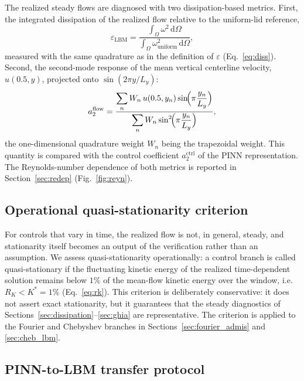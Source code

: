 \documentclass[aip,pof,reprint,superscriptaddress]{revtex4-2}
\begin{document}
The realized steady flows are diagnosed with two dissipation-based metrics. First, the integrated dissipation of the realized flow relative to the uniform-lid reference,
\begin{equation}\label{eq:lbm_diss}
\varepsilon_{\mathrm{LBM}}=\frac{\displaystyle\int_\Omega \omega^2\,\mathrm{d}\Omega}{\displaystyle\int_\Omega \omega_{\mathrm{uniform}}^2\,\mathrm{d}\Omega},
\end{equation}
measured with the same quadrature as in the definition of $\varepsilon$ (Eq.~\eqref{eq:diss}). Second, the second-mode response of the mean vertical centerline velocity,\\
$u(0.5,y)$, projected onto $\sin(2\pi y/L_y)$:
\begin{equation}\label{eq:lbm_phi}
a_2^{\mathrm{flow}}=\frac{\displaystyle\sum_{n}W_n\,u(0.5,y_n)\sin\!\Bigl(\pi\frac{y_n}{L_y}\Bigr)}{\displaystyle\sum_{n}W_n\sin^2\!\Bigl(\pi\frac{y_n}{L_y}\Bigr)},
\end{equation}
the one-dimensional quadrature weight $W_n$ being the trapezoidal weight. This quantity is compared with the control coefficient $a_2^{\mathrm{ctrl}}$ of the PINN representation. The Reynolds-number dependence of both metrics is reported in Section~\ref{sec:redep} (Fig.~\ref{fig:reyn}).

\subsection{Operational quasi-stationarity criterion}\label{sec:stationarity}

For controls that vary in time, the realized flow is not, in general, steady, and stationarity itself becomes an output of the verification rather than an assumption. We assess quasi-stationarity operationally: a control branch is called quasi-stationary if the fluctuating kinetic energy of the realized time-dependent solution remains below $1\%$ of the mean-flow kinetic energy over the window, i.e.\ $R_K<K^*=1\%$ (Eq.~\eqref{eq:rk}). This criterion is deliberately conservative: it does not assert exact stationarity, but it guarantees that the steady diagnostics of Sections~\ref{sec:dissipation}--\ref{sec:ghia} are representative. The criterion is applied to the Fourier and Chebyshev branches in Sections~\ref{sec:fourier_admis} and \ref{sec:cheb_lbm}.

\subsection{PINN-to-LBM transfer protocol}
\end{document}
